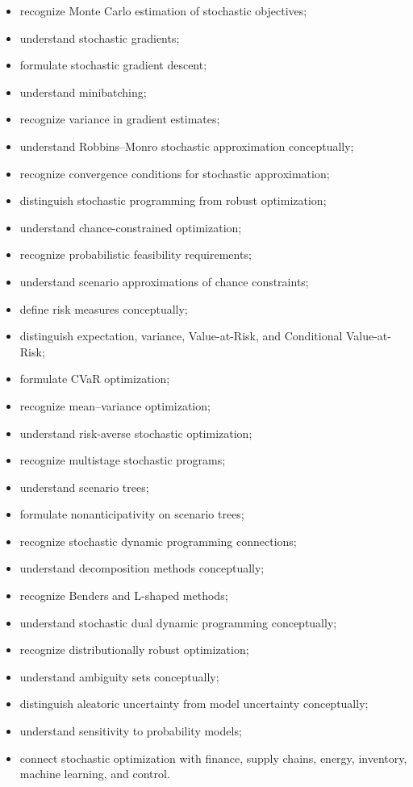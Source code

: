 {\begin{itemize}
    \item recognize Monte Carlo estimation of stochastic objectives;
    \item understand stochastic gradients;
    \item formulate stochastic gradient descent;
    \item understand minibatching;
    \item recognize variance in gradient estimates;
    \item understand Robbins--Monro stochastic approximation conceptually;
    \item recognize convergence conditions for stochastic approximation;
    \item distinguish stochastic programming from robust optimization;
    \item understand chance-constrained optimization;
    \item recognize probabilistic feasibility requirements;
    \item understand scenario approximations of chance constraints;
    \item define risk measures conceptually;
    \item distinguish expectation, variance, Value-at-Risk, and
          Conditional Value-at-Risk;
    \item formulate CVaR optimization;
    \item recognize mean--variance optimization;
    \item understand risk-averse stochastic optimization;
    \item recognize multistage stochastic programs;
    \item understand scenario trees;
    \item formulate nonanticipativity on scenario trees;
    \item recognize stochastic dynamic programming connections;
    \item understand decomposition methods conceptually;
    \item recognize Benders and L-shaped methods;
    \item understand stochastic dual dynamic programming conceptually;
    \item recognize distributionally robust optimization;
    \item understand ambiguity sets conceptually;
    \item distinguish aleatoric uncertainty from model uncertainty
          conceptually;
    \item understand sensitivity to probability models;
    \item connect stochastic optimization with finance, supply chains,
          energy, inventory, machine learning, and control.
\end{itemize}
}

